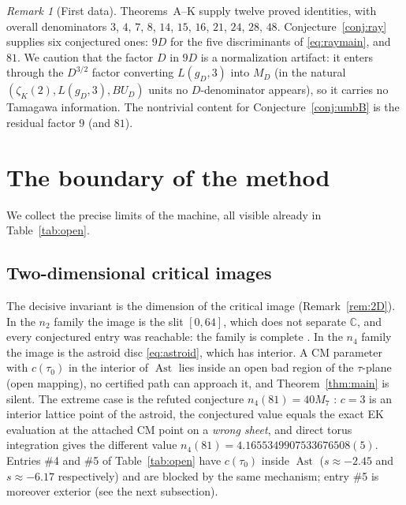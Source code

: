 \documentclass[11pt]{article}
\newcommand{\Cc}{\mathbb{C}}
\DeclareMathOperator{\Ast}{Ast}
\theoremstyle{definition}
\theoremstyle{remark}
\newtheorem{remark}[theorem]{Remark}
\begin{document}
\begin{remark}[First data]\label{rem:firstdata}
Theorems~A--K supply twelve proved identities, with overall
denominators
$3$, $4$, $7$, $8$, $14$, $15$, $16$, $21$, $24$, $28$, $48$.
Conjecture~\ref{conj:ray}
supplies six conjectured ones: $9D$ for the five discriminants of
\eqref{eq:raymain}, and $81$. We caution that the factor $D$ in
$9D$ is a normalization artifact: it enters through the $D^{3/2}$
factor converting $L(g_D,3)$ into $M_D$ (in the natural
$(\zeta_K(2),L(g_D,3),BU_D)$ units no $D$-denominator appears), so
it carries no Tamagawa information. The nontrivial content for
Conjecture~\ref{conj:umbB} is the residual factor $9$ (and $81$).
\end{remark}

\section{The boundary of the method}\label{sec:boundary}

We collect the precise limits of the machine, all visible already in
Table~\ref{tab:open}.

\subsection{Two-dimensional critical images}

The decisive invariant is the dimension of the critical image
(Remark~\ref{rem:2D}). In the $n_2$ family the image is the slit
$[0,64]$, which does not separate $\Cc$, and every conjectured entry
was reachable: the family is complete \cite{Zf,ZGQ,GPQ}. In the
$n_4$ family the image is the astroid disc \eqref{eq:astroid}, which
has interior. A CM parameter with $c(\tau_0)$ in the interior of
$\Ast$ lies inside an open bad region of the $\tau$-plane (open
mapping), no certified path can approach it, and
Theorem~\ref{thm:main} is silent. The extreme case is the refuted
conjecture $n_4(81)=40M_7$ \cite{Zf2}: $c=3$ is an interior lattice
point of the astroid, the conjectured value equals the exact EK
evaluation at the attached CM point on a \emph{wrong sheet}, and
direct torus integration gives the different value
$n_4(81)=4.1655349907533676508(5)$. Entries \#4 and \#5 of
Table~\ref{tab:open} have $c(\tau_0)$ inside $\Ast$ ($s\approx-2.45$
and $s\approx-6.17$ respectively) and are blocked by the same
mechanism; entry \#5 is moreover exterior (see the next subsection).
\end{document}
